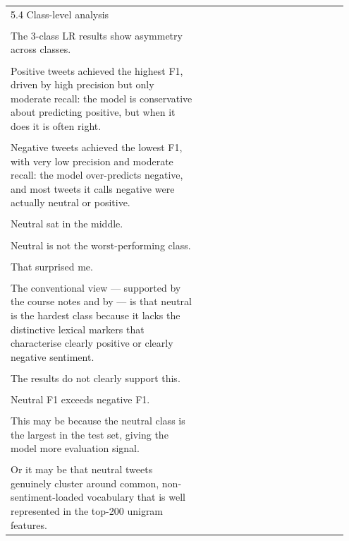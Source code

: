 \documentclass[11pt]{article}
\begin{document}
\begin{longtable}{|p{0.55\linewidth}|p{0.40\linewidth}|}
\hline
\rule{0pt}{3.5cm} & \\
\hline
5.4 Class-level analysis & \\[2pt]
\hline
\rule{0pt}{3.5cm} & \\
\hline
The 3-class LR results show asymmetry across classes. & \\[2pt]
\hline
\rule{0pt}{3.5cm} & \\
\hline
Positive tweets achieved the highest F1, driven by high precision but only moderate recall: the model is conservative about predicting positive, but when it does it is often right. & \\[2pt]
\hline
\rule{0pt}{3.5cm} & \\
\hline
Negative tweets achieved the lowest F1, with very low precision and moderate recall: the model over-predicts negative, and most tweets it calls negative were actually neutral or positive. & \\[2pt]
\hline
\rule{0pt}{3.5cm} & \\
\hline
Neutral sat in the middle. & \\[2pt]
\hline
\rule{0pt}{3.5cm} & \\
\hline
Neutral is not the worst-performing class. & \\[2pt]
\hline
\rule{0pt}{3.5cm} & \\
\hline
That surprised me. & \\[2pt]
\hline
\rule{0pt}{3.5cm} & \\
\hline
The conventional view --- supported by the course notes and by --- is that neutral is the hardest class because it lacks the distinctive lexical markers that characterise clearly positive or clearly negative sentiment. & \\[2pt]
\hline
\rule{0pt}{3.5cm} & \\
\hline
The results do not clearly support this. & \\[2pt]
\hline
\rule{0pt}{3.5cm} & \\
\hline
Neutral F1 exceeds negative F1. & \\[2pt]
\hline
\rule{0pt}{3.5cm} & \\
\hline
This may be because the neutral class is the largest in the test set, giving the model more evaluation signal. & \\[2pt]
\hline
\rule{0pt}{3.5cm} & \\
\hline
Or it may be that neutral tweets genuinely cluster around common, non-sentiment-loaded vocabulary that is well represented in the top-200 unigram features. & \\[2pt]

\end{longtable}
\end{document}
